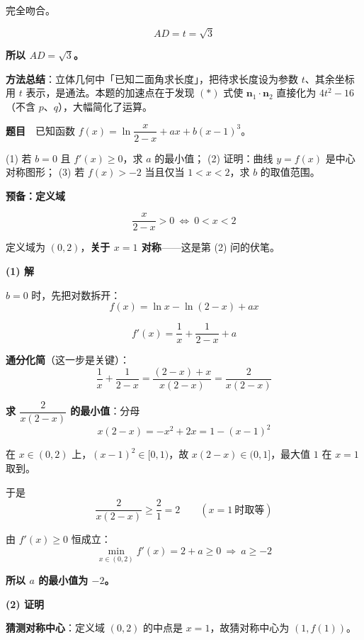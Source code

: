 完全吻合。

\[AD=t=\sqrt3\]

\textbf{所以 $AD=\sqrt3$。}

\begin{gktip}
\textbf{方法总结}：立体几何中「已知二面角求长度」，把待求长度设为参数 $t$、其余坐标用 $t$ 表示，是通法。本题的加速点在于发现 $(\ast)$ 式使 $\boldsymbol n_1\cdot\boldsymbol n_2$ 直接化为 $4t^2-16$（不含 $p$、$q$），大幅简化了运算。
\end{gktip}

\par\medskip


\textbf{题目}　已知函数 $f(x)=\ln\dfrac x{2-x}+ax+b(x-1)^{3}$。

  (1) 若 $b=0$ 且 $f'(x)\ge0$，求 $a$ 的最小值；
  (2) 证明：曲线 $y=f(x)$ 是中心对称图形；
  (3) 若 $f(x)>-2$ 当且仅当 $1<x<2$，求 $b$ 的取值范围。

\par\medskip

\textbf{预备：定义域}

\[\frac x{2-x}>0\ \Longleftrightarrow\ 0<x<2\]

定义域为 $(0,2)$，\textbf{关于 $x=1$ 对称}——这是第 (2) 问的伏笔。

\par\medskip

\textbf{(1) 解}

$b=0$ 时，先把对数拆开：
\[f(x)=\ln x-\ln(2-x)+ax\]

\[f'(x)=\frac1x+\frac1{2-x}+a\]

\textbf{通分化简}（这一步是关键）：
\[\frac1x+\frac1{2-x}=\frac{(2-x)+x}{x(2-x)}=\frac2{x(2-x)}\]

\textbf{求 $\dfrac2{x(2-x)}$ 的最小值}：分母
\[x(2-x)=-x^{2}+2x=1-(x-1)^{2}\]

在 $x\in(0,2)$ 上，$(x-1)^{2}\in[0,1)$，故 $x(2-x)\in(0,1]$，最大值 $1$ 在 $x=1$ 取到。

于是
\[\frac2{x(2-x)}\ge\frac21=2\qquad(x=1\ \text{时取等})\]

由 $f'(x)\ge0$ 恒成立：
\[\min_{x\in(0,2)}f'(x)=2+a\ge0\ \Longrightarrow\ a\ge-2\]

\textbf{所以 $a$ 的最小值为 $-2$。}

\par\medskip

\textbf{(2) 证明}

\textbf{猜测对称中心}：定义域 $(0,2)$ 的中点是 $x=1$，故猜对称中心为 $\left(1,f(1)\right)$。

